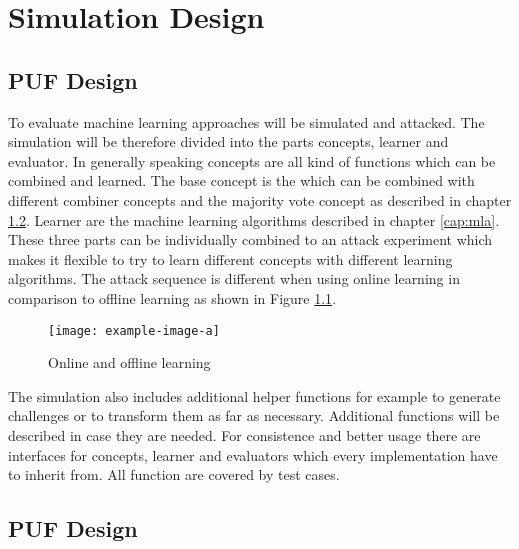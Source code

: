 \chapter{Simulation Design}
\label{cap:simulationdesign}




\section{\ac{PUF} Design}
\label{sec:pufsimulation}



\iffalse
To evaluate machine learning approaches \pufs will be simulated and attacked.
The simulation will be therefore divided into the parts concepts, learner and evaluator.
In generally speaking concepts are all kind of functions which can be combined and learned.
The base concept is the \apuf which can be combined with different combiner concepts and the majority vote concept as described in chapter \ref{sec:pufsimulation}.
Learner are the machine learning algorithms described in chapter \ref{cap:mla}.
These three parts can be individually combined to an attack experiment which makes it flexible to try to learn different concepts with different learning algorithms.
The attack sequence is different when using online learning in comparison to offline learning as shown in Figure \ref{fig:attackflow}.

\begin{figure}[ht]
\noindent\texttt{[image: example-image-a]}
\caption{Online and offline learning}
\label{fig:attackflow}
\end{figure}

The simulation also includes additional helper functions for example to generate challenges or to transform them as far as necessary.
Additional functions will be described in case they are needed.
For consistence and better usage there are interfaces for concepts, learner and evaluators which every implementation have to inherit from.
All function are covered by test cases.


\section{\ac{PUF} Design}
\label{sec:pufsimulation}

